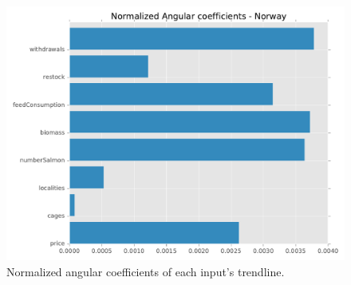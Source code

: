\newpage

\begin{figure}[H]
	\centering
    \includegraphics[width=1\textwidth]{Files/Norm_Ang_Coeffs.pdf}
    \caption{Normalized angular coefficients of each input's trendline.}
\end{figure}

